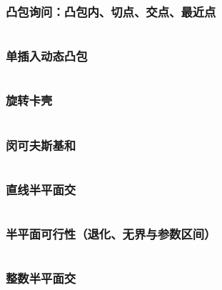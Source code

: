 	\subsubsection{凸包询问：凸包内、切点、交点、最近点}
		\inputminted{cpp}{sections/ComputationalGeometry/assets/Geometry/convex_findmax.cpp}
	\subsubsection{单插入动态凸包}
		\inputminted{cpp}{sections/ComputationalGeometry/assets/Geometry/dynamic_convex_hull.cpp}
	\subsubsection{旋转卡壳}
		\inputminted{cpp}{sections/ComputationalGeometry/assets/Geometry/旋转卡壳.cpp}
	\subsubsection{闵可夫斯基和}
		\inputminted{cpp}{sections/ComputationalGeometry/assets/Geometry/闵可夫斯基和.cpp}
	\subsubsection{直线半平面交}
		\inputminted{cpp}{sections/ComputationalGeometry/assets/Geometry/半平面交.cpp}
	\subsubsection{半平面可行性（退化、无界与参数区间）}
        
		\inputminted{cpp}{sections/ComputationalGeometry/assets/Geometry/halfplane_feasible_closed.cpp}
	\subsubsection{整数半平面交}
		\inputminted{cpp}{sections/ComputationalGeometry/assets/Geometry/integral_hpi.cpp}

